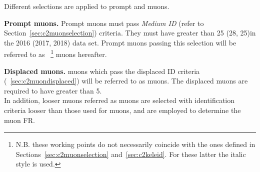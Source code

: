 Different selections are applied to prompt and \displ muons.

\textbf {Prompt muons.}
Prompt muons must pass \emph{Medium ID} (refer
to Section~\ref{sec:c2muonselection}) criteria. They must have \pt greater than
25 (28, 25)\GeV in the 2016 (2017, 2018) data set.
Prompt muons passing this selection will be referred to as \tP~\footnote{
N.B. these working points do not necessarily coincide with the ones
defined in Sections~\ref{sec:c2muonselection}
and~\ref{sec:c2keleid}. For these latter the italic style is used.} muons hereafter.

\textbf {Displaced muons.}
\Displ muons which pass the displaced ID criteria
(~\ref{sec:c2muondisplaced}) will be referred to as \tD
muons. The displaced muons are required to have \pt greater than 5\GeV.\\
In addition, looser muons referred as \fo muons are selected
with identification criteria looser than those used for \tD muons, and are employed to determine the muon FR.

